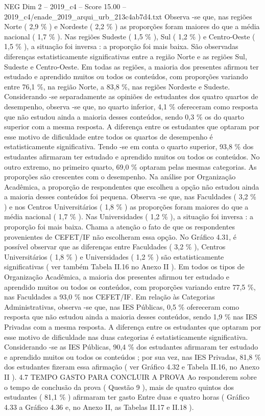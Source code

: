 \begin{textsample}{NEG Dim 2 – 2019\_c4 – Score 15.00 – 2019\_c4/enade\_2019\_arqui\_urb\_213c4ab7d4.txt}
Observa -se que, nas regiões Norte ( 2,9 \% ) e Nordeste ( 2,2 \% ) as proporções foram maiores do que a média nacional ( 1,7 \% ).
Nas regiões Sudeste ( 1,5 \% ), Sul ( 1,2 \% ) e Centro-Oeste ( 1,5 \% ), a situação foi inversa : a proporção foi mais baixa.
São observadas diferenças estatisticamente significativas entre a região Norte e as regiões Sul, Sudeste e Centro-Oeste.
Em todas as regiões, a maioria dos presentes afirmou ter estudado e aprendido muitos ou todos os conteúdos, com proporções variando entre 76,1 \%, na região Norte, a 83,8 \%, nas regiões Nordeste e Sudeste.
Considerando -se separadamente as opiniões de estudantes dos quatro quartos de desempenho, observa -se que, no quarto inferior, 4,1 \% ofereceram como resposta que não estudou ainda a maioria desses conteúdos, sendo 0,3 \% os do quarto superior com a mesma resposta.
A diferença entre os estudantes que optaram por esse motivo de dificuldade entre todos os quartos de desempenho é estatisticamente significativa.
Tendo -se em conta o quarto superior, 93,8 \% dos estudantes afirmaram ter estudado e aprendido muitos ou todos os conteúdos.
No outro extremo, no primeiro quarto, 69,0 \% optaram pelas mesmas categorias.
As proporções são crescentes com o desempenho.
Na análise por Organização Acadêmica, a proporção de respondentes que escolheu a opção não estudou ainda a maioria desses conteúdos foi pequena.
Observa -se que, nas Faculdades ( 3,2 \% ) e nos Centros Universitários ( 1,8 \% ) as proporções foram maiores do que a média nacional ( 1,7 \% ).
Nas Universidades ( 1,2 \% ), a situação foi inversa : a proporção foi mais baixa.
Chama a atenção o fato de que os respondentes provenientes de CEFET/IF não escolheram essa opção.
No Gráfico 4.31, é possível observar que as diferenças entre Faculdades ( 3,2 \% ), Centros Universitários ( 1,8 \% ) e Universidades ( 1,2 \% ) são estatisticamente significativas ( ver também Tabela II.16 no Anexo II ).
Em todos os tipos de Organização Acadêmica, a maioria dos presentes afirmou ter estudado e aprendido muitos ou todos os conteúdos, com proporções variando entre 77,5 \%, nas Faculdades a 93,0 \% nos CEFET/IF.
Em relação às Categorias Administrativas, observa -se que, nas IES Públicas, 0,5 \% ofereceram como resposta que não estudou ainda a maioria desses conteúdos, sendo 1,9 \% nas IES Privadas com a mesma resposta.
A diferença entre os estudantes que optaram por esse motivo de dificuldade nas duas categorias é estatisticamente significativa.
Considerando -se as IES Públicas, 90,4 \% dos estudantes afirmaram ter estudado e aprendido muitos ou todos os conteúdos ; por sua vez, nas IES Privadas, 81,8 \% dos estudantes fizeram essa afirmação ( ver Gráfico 4.32 e Tabela II.16, no Anexo II ). 4.7 TEMPO GASTO PARA CONCLUIR A PROVA Ao responderem sobre o tempo de conclusão da prova ( Questão 9 ), mais de quatro quintos dos estudantes ( 81,1 \% ) afirmaram ter gasto Entre duas e quatro horas ( Gráfico 4.33 a Gráfico 4.36 e, no Anexo II, as Tabelas II.17 e II.18 ).

\end{textsample}
